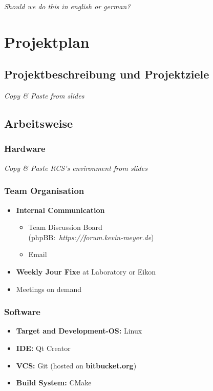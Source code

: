 \documentclass[12pt]{article}
\begin{document}
\textit{Should we do this in english or german?}

\section{Projektplan}
\subsection{Projektbeschreibung und Projektziele}
\textit{Copy \& Paste from slides}

\subsection{Arbeitsweise}
\subsubsection*{Hardware}
\textit{Copy \& Paste RCS's environment from slides}\\

\subsubsection*{Team Organisation}
\begin{itemize}
	\item \textbf{Internal Communication}
	\begin{itemize}
		\item Team Discussion Board \\\mbox{(phpBB: \textit{https://forum.kevin-meyer.de})}
		\item Email
	\end{itemize}
	\item \textbf{Weekly Jour Fixe} at Laboratory or Eikon
	\item Meetings on demand
\end{itemize}

\subsubsection*{Software}
\begin{itemize}
	\item \textbf{Target and Development-OS:} Linux
	\item \textbf{IDE:} Qt Creator
	\item \textbf{VCS:} Git (hosted on \textbf{bitbucket.org})
	\item \textbf{Build System:} CMake
\end{itemize}
\end{document}

